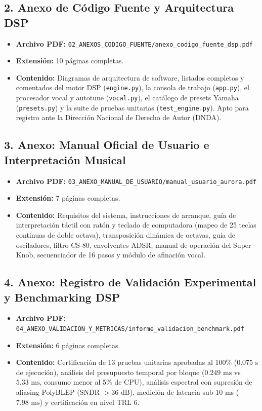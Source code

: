 \documentclass[11pt,a4paper]{article}
\begin{document}
\subsection{2. Anexo de Código Fuente y Arquitectura DSP}
\begin{itemize}[leftmargin=1.5cm]
    \item \textbf{Archivo PDF:} \texttt{02\_ANEXOS\_CODIGO\_FUENTE/anexo\_codigo\_fuente\_dsp.pdf}
    \item \textbf{Extensión:} 10 páginas completas.
    \item \textbf{Contenido:} Diagramas de arquitectura de software, listados completos y comentados del motor DSP (\texttt{engine.py}), la consola de trabajo (\texttt{app.py}), el procesador vocal y autotune (\texttt{vocal.py}), el catálogo de presets Yamaha (\texttt{presets.py}) y la suite de pruebas unitarias (\texttt{test\_engine.py}). Apto para registro ante la Dirección Nacional de Derecho de Autor (DNDA).
\end{itemize}

\subsection{3. Anexo: Manual Oficial de Usuario e Interpretación Musical}
\begin{itemize}[leftmargin=1.5cm]
    \item \textbf{Archivo PDF:} \texttt{03\_ANEXO\_MANUAL\_DE\_USUARIO/manual\_usuario\_aurora.pdf}
    \item \textbf{Extensión:} 7 páginas completas.
    \item \textbf{Contenido:} Requisitos del sistema, instrucciones de arranque, guía de interpretación táctil con ratón y teclado de computadora (mapeo de 25 teclas continuas de doble octava), transposición dinámica de octavas, guía de osciladores, filtro CS-80, envolventes ADSR, manual de operación del Super Knob, secuenciador de 16 pasos y módulo de afinación vocal.
\end{itemize}

\subsection{4. Anexo: Registro de Validación Experimental y Benchmarking DSP}
\begin{itemize}[leftmargin=1.5cm]
    \item \textbf{Archivo PDF:} \texttt{04\_ANEXO\_VALIDACION\_Y\_METRICAS/informe\_validacion\_benchmark.pdf}
    \item \textbf{Extensión:} 6 páginas completas.
    \item \textbf{Contenido:} Certificación de 13 pruebas unitarias aprobadas al 100\% (0.075 s de ejecución), análisis del presupuesto temporal por bloque ($0.249\text{ ms}$ vs $5.33\text{ ms}$, consumo menor al 5\% de CPU), análisis espectral con supresión de aliasing PolyBLEP (SNDR $> 36\text{ dB}$), medición de latencia sub-10 ms ($7.98\text{ ms}$) y certificación en nivel TRL 6.
\end{itemize}
\end{document}
